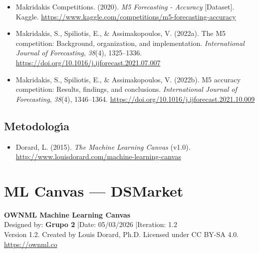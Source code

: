 \documentclass[12pt, a4paper, oneside]{report}
\begin{document}
\begin{itemize}[leftmargin=2em, noitemsep]

\item Makridakis Competitions. (2020). \textit{M5 Forecasting - Accuracy} [Dataset]. Kaggle. \url{https://www.kaggle.com/competitions/m5-forecasting-accuracy}

\item Makridakis, S., Spiliotis, E., \& Assimakopoulos, V. (2022a). The M5 competition: Background, organization, and implementation. \textit{International Journal of Forecasting}, \textit{38}(4), 1325--1336. \url{https://doi.org/10.1016/j.ijforecast.2021.07.007}

\item Makridakis, S., Spiliotis, E., \& Assimakopoulos, V. (2022b). M5 accuracy competition: Results, findings, and conclusions. \textit{International Journal of Forecasting}, \textit{38}(4), 1346--1364. \url{https://doi.org/10.1016/j.ijforecast.2021.10.009}

\end{itemize}

\section*{Metodolog\'{\i}a}

\begin{itemize}[leftmargin=2em, noitemsep]

\item Dorard, L. (2015). \textit{The Machine Learning Canvas} (v1.0). \url{http://www.louisdorard.com/machine-learning-canvas}

\end{itemize}

\renewcommand{\appendixname}{Anexo}
\appendix
\chapter{ML Canvas --- DSMarket}
\label{app:mlcanvas}

\begin{center}
{\large\bfseries\color{nuclioblue} OWNML Machine Learning Canvas}\\[0.3cm]
{\small Designed by: \textbf{Grupo 2} \quad|\quad Date: 05/03/2026 \quad|\quad Iteration: 1.2}\\[0.15cm]
{\footnotesize\color{nucliogray} Version 1.2. Created by Louis Dorard, Ph.D. Licensed under CC BY-SA 4.0. \url{https://ownml.co}}
\end{center}
\end{document}
